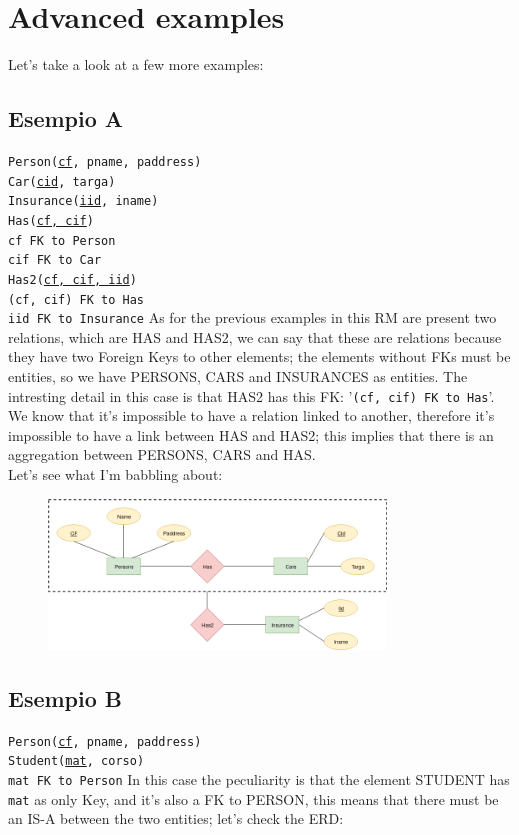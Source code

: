 \documentclass[12pt, oneside]{report}
\newcommand\tab[1][1cm]{\hspace*{#1}}
\begin{document}
\section{Advanced examples}
Let's take a look at a few more examples:
\subsection*{Esempio A}
\texttt{Person(\underline{cf}, pname, paddress)}\\
\texttt{Car(\underline{cid}, targa)}\\
\texttt{Insurance(\underline{iid}, iname)}\\
\texttt{Has(\underline{cf, cif})}\\
\tab[.4cm] \texttt{cf FK to Person}\\
\tab[.4cm] \texttt{cif FK to Car}\\
\texttt{Has2(\underline{cf, cif, iid})}\\
\tab[.4cm] \texttt{(cf, cif) FK to Has}\\
\tab[.4cm] \texttt{iid FK to Insurance}
\vskip 8pt
As for the previous examples in this RM are present two relations, which are HAS and HAS2, we can say that these are relations because they have two Foreign Keys to other elements; the elements without FKs must be entities, so we have PERSONS, CARS and INSURANCES as entities.
The intresting detail in this case is that HAS2 has this FK: '\texttt{(cf, cif) FK to Has}'.\\
We know that it's impossible to have a relation linked to another, therefore it's impossible to have a link between HAS and HAS2; this implies that there is an aggregation between PERSONS, CARS and HAS.\\
Let's see what I'm babbling about:
\begin{figure}[H]
	\centering
	\includegraphics[width=0.8\textwidth,keepaspectratio]{diagram6_00.png}
	\label{diagram6_00}
\end{figure}

\subsection*{Esempio B}
\texttt{Person(\underline{cf}, pname, paddress)}\\
\texttt{Student(\underline{mat}, corso)}\\
\tab[.4cm] \texttt{mat FK to Person}
\vskip 8pt
In this case the peculiarity is that the element STUDENT has \texttt{mat} as only Key, and it's also a FK to PERSON, this means that there must be an IS-A between the two entities; let's check the ERD:
\end{document}
